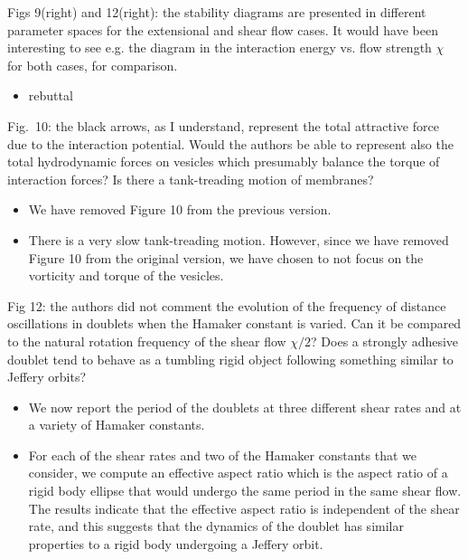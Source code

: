 \documentclass[11pt]{article}
\newcommand{\comment}[1]{{\color{blue} #1}}
\begin{document}
\noindent
\comment{ Figs 9(right) and 12(right): the stability diagrams are presented
in different parameter spaces for the extensional and shear flow
cases. It would have been interesting to see e.g. the diagram in the
interaction energy vs. flow strength $\chi$ for both cases, for
comparison.}
\begin{itemize}
  \item rebuttal
\end{itemize}

\noindent
\comment{Fig.~10: the black arrows, as I understand, represent the total
attractive force due to the interaction potential. Would the authors
be able to represent also the total hydrodynamic forces on vesicles
which presumably balance the torque of interaction forces? Is there a
tank-treading motion of membranes?}
\begin{itemize}
  \item We have removed Figure 10 from the previous version.

  \item There is a very slow tank-treading motion.  However, since we
    have removed Figure 10 from the original version, we have chosen to
    not focus on the vorticity and torque of the vesicles.
\end{itemize}

\noindent
\comment{Fig 12: the authors did not comment the evolution of the
frequency of distance oscillations in doublets when the Hamaker constant
is varied. Can it be compared to the natural rotation frequency of the
shear flow $\chi/2$? Does a strongly adhesive doublet tend to behave as
a tumbling rigid object following something similar to Jeffery orbits?}
\begin{itemize}
  \item We now report the period of the doublets at three different
    shear rates and at a variety of Hamaker constants.

  \item For each of the shear rates and two of the Hamaker constants
    that we consider, we compute an effective aspect ratio which is the
    aspect ratio of a rigid body ellipse that would undergo the same
    period in the same shear flow.  The results indicate that the
    effective aspect ratio is independent of the shear rate, and this
    suggests that the dynamics of the doublet has similar properties to
    a rigid body undergoing a Jeffery orbit. 
\end{itemize}
\end{document}
